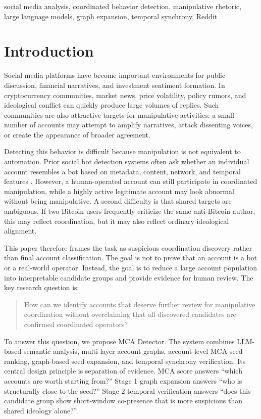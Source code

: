 \documentclass[conference]{IEEEtran}
\begin{document}
\begin{IEEEkeywords}
social media analysis, coordinated behavior detection, manipulative rhetoric,
large language models, graph expansion, temporal synchrony, Reddit
\end{IEEEkeywords}

\section{Introduction}

Social media platforms have become important environments for public
discussion, financial narratives, and investment sentiment formation. In
cryptocurrency communities, market news, price volatility, policy rumors, and
ideological conflict can quickly produce large volumes of replies. Such
communities are also attractive targets for manipulative activities: a small
number of accounts may attempt to amplify narratives, attack dissenting
voices, or create the appearance of broader agreement.

Detecting this behavior is difficult because manipulation is not equivalent to
automation. Prior social bot detection systems often ask whether an individual
account resembles a bot based on metadata, content, network, and temporal
features \cite{ferrara2016rise,varol2017online}. However, a human-operated
account can still participate in coordinated manipulation, while a highly
active legitimate account may look abnormal without being manipulative. A
second difficulty is that shared targets are ambiguous. If two Bitcoin users
frequently criticize the same anti-Bitcoin author, this may reflect
coordination, but it may also reflect ordinary ideological alignment.

This paper therefore frames the task as suspicious coordination discovery
rather than final account classification. The goal is not to prove that an
account is a bot or a real-world operator. Instead, the goal is to reduce a
large account population into interpretable candidate groups and provide
evidence for human review. The key research question is:

\begin{quote}
How can we identify accounts that deserve further review for manipulative
coordination without overclaiming that all discovered candidates are confirmed
coordinated operators?
\end{quote}

To answer this question, we propose MCA Detector. The system combines
LLM-based semantic analysis, multi-layer account graphs, account-level MCA
seed ranking, graph-based seed expansion, and temporal synchrony verification.
Its central design principle is separation of evidence. MCA score answers
``which accounts are worth starting from?'' Stage 1 graph expansion answers
``who is structurally close to the seed?'' Stage 2 temporal verification
answers ``does this candidate group show short-window co-presence that is more
suspicious than shared ideology alone?''
\end{document}
